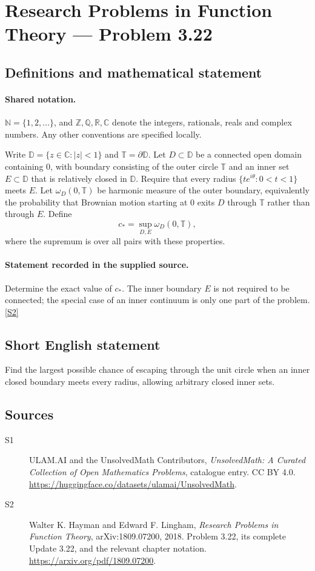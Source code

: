 \documentclass[11pt]{book}
\newcommand{\sref}[2]{\hyperlink{source:#1:#2}{[S#2]}}
\begin{document}
\section{Research Problems in Function Theory — Problem 3.22}\label{statement}

\subsection{Definitions and mathematical statement}

\paragraph{Shared notation.}$\mathbb N=\{1,2,\ldots\}$, and $\mathbb Z,\mathbb Q,\mathbb R,\mathbb C$ denote the integers, rationals, reals and complex numbers. Any other conventions are specified locally.


Write $\mathbb D=\{z\in\mathbb C:|z|<1\}$ and $\mathbb T=\partial\mathbb D$. Let $D\subset\mathbb D$ be a connected open domain containing $0$, with boundary consisting of the outer circle $\mathbb T$ and an inner set $E\subset\mathbb D$ that is relatively closed in $\mathbb D$. Require that every radius $\{te^{i\theta}:0<t<1\}$ meets $E$. Let $\omega_D(0,\mathbb T)$ be harmonic measure of the outer boundary, equivalently the probability that Brownian motion starting at $0$ exits $D$ through $\mathbb T$ rather than through $E$. Define
\[c_* = \sup_{D,E}\omega_D(0,\mathbb T),\]
where the supremum is over all pairs with these properties.
\paragraph{Statement recorded in the supplied source.}
Determine the exact value of $c_*$. The inner boundary $E$ is not required to be connected; the special case of an inner continuum is only one part of the problem. \sref{statement}{2}
\subsection{Short English statement}
Find the largest possible chance of escaping through the unit circle when an inner closed boundary meets every radius, allowing arbitrary closed inner sets.
\subsection{Sources}
\begin{description}
\item[\hypertarget{source:statement:1}{S1}] ULAM.AI and the UnsolvedMath Contributors, \emph{UnsolvedMath: A Curated Collection of Open Mathematics Problems}, catalogue entry. CC BY 4.0. \url{https://huggingface.co/datasets/ulamai/UnsolvedMath}.
\item[\hypertarget{source:statement:2}{S2}] Walter K. Hayman and Edward F. Lingham, \emph{Research Problems in Function Theory}, arXiv:1809.07200, 2018. Problem 3.22, its complete Update 3.22, and the relevant chapter notation. \url{https://arxiv.org/pdf/1809.07200}.
\end{description}
\label{end:statement}
\end{document}
